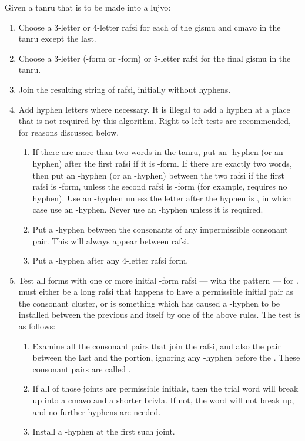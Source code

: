 Given a tanru that is to be made into a lujvo:
\begin{enumerate}
\item Choose a 3-letter or 4-letter rafsi for each of the gismu and cmavo in the tanru except the last.
\item Choose a 3-letter (-form or -form) or 5-letter rafsi for the final gismu in the tanru.
\item Join the resulting string of rafsi, initially without hyphens.
\item Add hyphen letters where necessary. It is illegal to add a hyphen at a place that is not required by this algorithm. Right-to-left tests are recommended, for reasons discussed below.\begin{enumerate}
\item If there are more than two words in the tanru, put an -hyphen (or an -hyphen) after the first rafsi if it is -form. If there are exactly two words, then put an -hyphen (or an -hyphen) between the two rafsi if the first rafsi is -form, unless the second rafsi is -form (for example,  requires no hyphen). Use an -hyphen unless the letter after the hyphen is , in which case use an -hyphen. Never use an -hyphen unless it is required.
\item Put a -hyphen between the consonants of any impermissible consonant pair. This will always appear between rafsi.
\item Put a -hyphen after any 4-letter rafsi form.
\end{enumerate}

\item Test all forms with one or more initial -form rafsi --- with the pattern  --- for .  must either be a  long rafsi that happens to have a permissible initial pair as the consonant cluster, or is something which has caused a -hyphen to be installed between the previous  and itself by one of the above rules. The test is as follows:
\begin{enumerate}
\item Examine all the  consonant pairs that join the  rafsi, and also the pair between the last  and the  portion, ignoring any -hyphen before the . These consonant pairs are called .
\item If all of those joints are permissible initials, then the trial word will break up into a cmavo and a shorter brivla. If not, the word will not break up, and no further hyphens are needed.
\item Install a -hyphen at the first such joint.
\end{enumerate}\end{enumerate}

